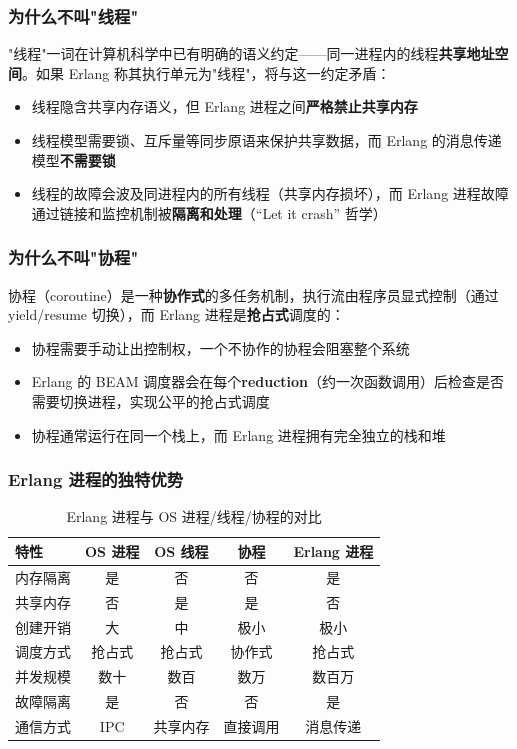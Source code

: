 \subsubsection{为什么不叫"线程"}

"线程"一词在计算机科学中已有明确的语义约定——同一进程内的线程\textbf{共享地址空间}。如果 Erlang 称其执行单元为"线程"，将与这一约定矛盾：

\begin{itemize}[leftmargin=1.5em]
    \item 线程隐含共享内存语义，但 Erlang 进程之间\textbf{严格禁止共享内存}
    \item 线程模型需要锁、互斥量等同步原语来保护共享数据，而 Erlang 的消息传递模型\textbf{不需要锁}
    \item 线程的故障会波及同进程内的所有线程（共享内存损坏），而 Erlang 进程故障通过链接和监控机制被\textbf{隔离和处理}（``Let it crash'' 哲学）
\end{itemize}

\subsubsection{为什么不叫"协程"}

协程（coroutine）是一种\textbf{协作式}的多任务机制，执行流由程序员显式控制（通过 yield/resume 切换），而 Erlang 进程是\textbf{抢占式}调度的：

\begin{itemize}[leftmargin=1.5em]
    \item 协程需要手动让出控制权，一个不协作的协程会阻塞整个系统
    \item Erlang 的 BEAM 调度器会在每个\textbf{reduction}（约一次函数调用）后检查是否需要切换进程，实现公平的抢占式调度
    \item 协程通常运行在同一个栈上，而 Erlang 进程拥有完全独立的栈和堆
\end{itemize}

\subsubsection{Erlang 进程的独特优势}

\begin{table}[H]
\centering
\caption{Erlang 进程与 OS 进程/线程/协程的对比}
\begin{tabular}{lcccc}
\toprule
\textbf{特性} & \textbf{OS 进程} & \textbf{OS 线程} & \textbf{协程} & \textbf{Erlang 进程} \\
\midrule
内存隔离       & 是       & 否       & 否       & 是 \\
共享内存       & 否       & 是       & 是       & 否 \\
创建开销       & 大       & 中       & 极小     & 极小 \\
调度方式       & 抢占式   & 抢占式   & 协作式   & 抢占式 \\
并发规模       & 数十     & 数百     & 数万     & 数百万 \\
故障隔离       & 是       & 否       & 否       & 是 \\
通信方式       & IPC      & 共享内存 & 直接调用 & 消息传递 \\
\bottomrule
\end{tabular}
\end{table}

